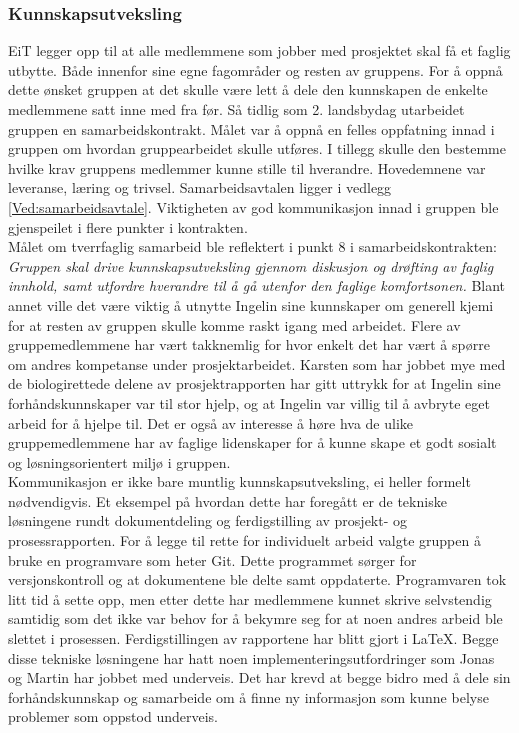 \subsubsection{Kunnskapsutveksling}
EiT legger opp til at alle medlemmene som jobber med prosjektet skal få et faglig utbytte.
Både innenfor sine egne fagområder og resten av gruppens.
For å oppnå dette ønsket gruppen at det skulle være lett å dele den kunnskapen de enkelte medlemmene satt inne med fra før.
Så tidlig som 2. landsbydag utarbeidet gruppen en samarbeidskontrakt.
Målet var å oppnå en felles oppfatning innad i gruppen om hvordan gruppearbeidet skulle utføres.
I tillegg skulle den bestemme hvilke krav gruppens medlemmer kunne stille til hverandre.
Hovedemnene var leveranse, læring og trivsel.
Samarbeidsavtalen ligger i vedlegg \ref{Ved:samarbeidsavtale}.
Viktigheten av god kommunikasjon innad i gruppen ble gjenspeilet i flere punkter i kontrakten. \\

Målet om tverrfaglig samarbeid ble reflektert i punkt 8 i samarbeidskontrakten: \textit{Gruppen skal drive kunnskapsutveksling gjennom diskusjon og drøfting av faglig innhold, samt utfordre hverandre til å gå utenfor den faglige komfortsonen.} Blant annet ville det være viktig å utnytte Ingelin sine kunnskaper om generell kjemi for at resten av gruppen skulle komme raskt igang med arbeidet.
Flere av gruppemedlemmene har vært takknemlig for hvor enkelt det har vært å spørre om andres kompetanse under prosjektarbeidet.
Karsten som har jobbet mye med de biologirettede delene av prosjektrapporten har gitt uttrykk for at Ingelin sine forhåndskunnskaper var til stor hjelp, og at Ingelin var villig til å avbryte eget arbeid for å hjelpe til.
Det er også av interesse å høre hva de ulike gruppemedlemmene har av faglige lidenskaper for å kunne skape et godt sosialt og løsningsorientert miljø i gruppen. \\

Kommunikasjon er ikke bare muntlig kunnskapsutveksling, ei heller formelt nødvendigvis.
Et eksempel på hvordan dette har foregått er de tekniske løsningene rundt dokumentdeling og ferdigstilling av prosjekt- og prosessrapporten.
For å legge til rette for individuelt arbeid valgte gruppen å bruke en programvare som heter Git.
Dette programmet sørger for versjonskontroll og at dokumentene ble delte samt oppdaterte.
Programvaren tok litt tid å sette opp, men etter dette har medlemmene kunnet skrive selvstendig samtidig som det ikke var behov for å bekymre seg for at noen andres arbeid ble slettet i prosessen.
Ferdigstillingen av rapportene har blitt gjort i \LaTeX.
Begge disse tekniske løsningene har hatt noen implementeringsutfordringer som Jonas og Martin har jobbet med underveis.
Det har krevd at begge bidro med å dele sin forhåndskunnskap og samarbeide om å finne ny informasjon som kunne belyse problemer som oppstod underveis. \\
